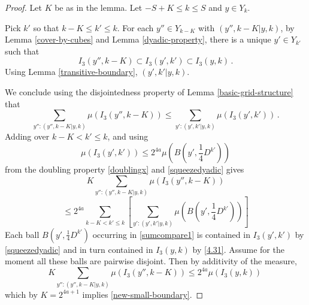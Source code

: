 \begin{proof}
Let $K$ be as in the lemma. Let $-S+K\le k\le S$ and $y\in Y_k$.

Pick $k'$ so that $k-K\le k'\le k$.
For each $y''\in Y_{k-K}$ with $(y'',k-K| y,k)$,
by Lemma \ref{cover-by-cubes} and Lemma \ref{dyadic-property}, there is a unique $y'\in Y_{k'}$ such that
\begin{equation}\label{4.31}
    I_3(y'',k-K)\subset I_3(y',k')\subset I_3(y,k)\, .
\end{equation}
Using Lemma \ref{transitive-boundary}, $(y',k'|y,k)$.

We conclude using the disjointedness property of
Lemma \ref{basic-grid-structure} that
\begin{equation}\label{scalecompare}
    \sum_{y'': (y'',k-K|y,k)}\mu(I_3(y'',k-K))
   \le
\sum_{y': (y',k'|y,k)}
\mu(I_3(y',k'))    \, .
   \end{equation}
Adding over $k-K<k'\le k$, and using
\[\mu(I_3(y',k'))\le 2^{4a} \mu(B(y', \frac 14 D^{k'}))\]
from the doubling property \eqref{doublingx} and
\eqref{squeezedyadic} gives
\begin{equation}\label{sumcompare}
    K\sum_{y'': (y'',k-K|y,k)}
    \mu(I_3(y'',k-K))
\end{equation}
\begin{equation}\label{sumcompare1}
    \le 2^{4a} \sum_{k-K<k'\le k}
   \left[ \sum_{y': (y',k'|y,k)}
\mu(B(y', \frac 14 D^{k'}))\right]
\end{equation}
Each ball $B(y', \frac 14 D^{k'})$ occurring in
\eqref{sumcompare1} is contained in $I_3(y',k')$
by \eqref{squeezedyadic} and in turn contained in
$I_3(y,k)$ by \eqref{4.31}. Assume for the moment all these balls are pairwise disjoint. Then
by additivity of the measure,
\begin{equation}
    K\sum_{y'': (y'',k-K|y,k)}
    \mu(I_3(y'',k-K))
    \le 2^{4a}
\mu(I_3(y,k))\,
\end{equation}
which by $K=2^{4a+1}$ implies \eqref{new-small-boundary}.


\end{proof}
